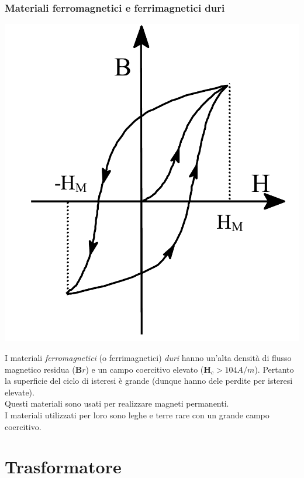 \documentclass{article}
\begin{document}
\subsubsection{Materiali ferromagnetici e ferrimagnetici duri}
\begin{center}
    \includegraphics[scale=0.2]{Image/Isteresi_magnetica_4.png}
\end{center}
I materiali \textit{ferromagnetici} (o ferrimagnetici) \textit{duri} hanno un'alta
densità di flusso magnetico residua ($\mathbf{B}r$) e un campo coercitivo elevato ($\mathbf{H}_c > 104 A/m$). Pertanto la superficie del ciclo di isteresi è grande (dunque hanno dele perdite per isteresi elevate).\\
Questi materiali sono usati per realizzare magneti permanenti.\\
I materiali utilizzati per loro sono leghe e
terre rare con un grande campo coercitivo.




\section{Trasformatore}
\end{document}
